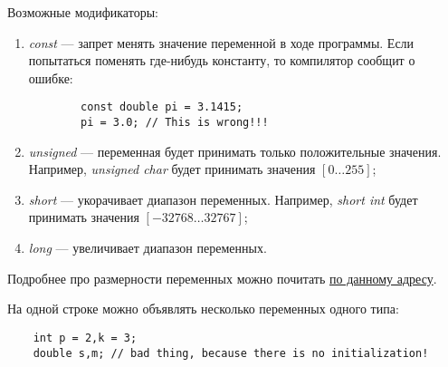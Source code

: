 Возможные модификаторы:
\begin{enumerate}
    \item \textit{const} --- запрет менять значение переменной в ходе программы. Если попытаться поменять где-нибудь константу, то компилятор сообщит о ошибке:
    \lstset{style=CPlusPlus}
    \begin{lstlisting}
        const double pi = 3.1415;
        pi = 3.0; // This is wrong!!!
    \end{lstlisting}
    \item \textit{unsigned} --- переменная будет принимать только положительные значения. Например, \textit{unsigned char} будет принимать значения $\left[ 0 \ldots 255 \right]$;
    \item \textit{short} --- укорачивает диапазон переменных. Например, \textit{short int} будет принимать значения $\left[ -32768 \ldots 32767 \right]$;
    \item \textit{long} --- увеличивает диапазон переменных.
\end{enumerate}

Подробнее про размерности переменных можно почитать \href{https://msdn.microsoft.com/ru-ru/library/s3f49ktz%28v=vs.120%29.aspx}{по данному адресу}.

На одной строке можно объявлять несколько переменных одного типа:
\lstset{style=CPlusPlus}
\begin{lstlisting}
    int p = 2,k = 3;
    double s,m; // bad thing, because there is no initialization!
\end{lstlisting}

